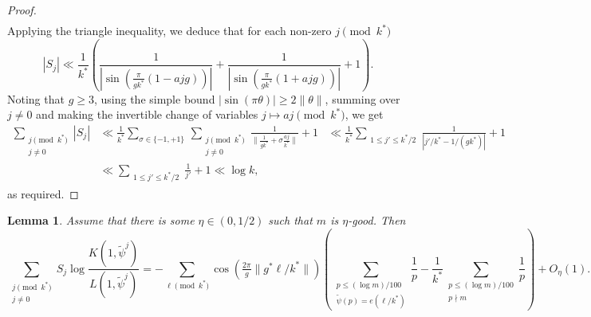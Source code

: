 \documentclass[10pt]{amsart}
\newtheorem{lem}[thm]{Lemma}
\theoremstyle{definition}
\newcommand{\sg}{\sigma}
\renewcommand{\ss}{\substack}
\begin{document}
\begin{proof}
\begin{align*}
\end{align*}
Applying the triangle inequality, we deduce that for each non-zero $j \pmod{k^\ast}$
$$
|S_j| \ll \frac{1}{k^\ast}\left(\frac{1}{|\sin(\tfrac{\pi}{gk^\ast}(1-ajg))|} + \frac{1}{|\sin(\tfrac{\pi}{gk^\ast}(1+ajg))|} + 1\right).
$$
Noting that $g \geq 3$, using the simple bound $|\sin(\pi \theta)| \geq 2\|\theta\|$, summing over $j \neq 0$ and making the invertible change of variables $j \mapsto aj \pmod{k^\ast}$, we get
\begin{align*}
\sum_{\ss{j \pmod{k^\ast} \\ j \neq 0}} |S_j| &\ll \frac{1}{k^\ast}\sum_{\sg \in \{-1,+1\}} \, \sum_{\ss{j \pmod{k^\ast} \\ j \neq 0}} \frac{1}{\|\tfrac{1}{gk^\ast} + \sg \tfrac{aj}{k^\ast}\|} + 1 &\ll \frac{1}{k^\ast}\sum_{\ss{1 \leq j' \leq k^\ast/2}} \frac{1}{|j'/k^\ast - 1/(gk^\ast)|} + 1\\
&\ll \sum_{\ss{1 \leq j' \leq k^\ast/2}} \frac{1}{j'} + 1 \ll \log k,
\end{align*}
as required.
\end{proof}
\begin{lem} \label{lem:controlErr}
Assume that there is some $\eta \in (0,1/2)$ such that $m$ is $\eta$-good. Then
$$
\sum_{\ss{j \pmod{k^\ast} \\ j \neq 0}} S_j \log \frac{K(1,\tilde{\psi}^j)}{L(1,\tilde{\psi}^j)} = -\sum_{\ell \pmod{k^\ast}} \cos(\tfrac{2\pi}{g} \|g^\ast \ell/k^\ast\|) \left(\sum_{\ss{p \leq (\log m)/100 \\ \tilde{\psi}(p) = e(\ell/k^\ast)}} \frac{1}{p} - \frac{1}{k^\ast} \sum_{\ss{p \leq (\log m)/100 \\ p \nmid m}} \frac{1}{p} \right) + O_{\eta}(1).
$$
\end{lem}
\end{document}
